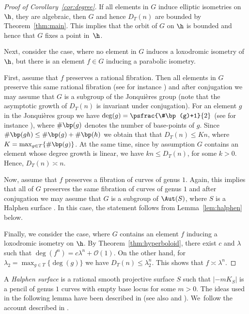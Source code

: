 \begin{proof}[Proof of Corollary~\ref{cor:degree}]
If all elements in $G$ induce elliptic isometries on $\h$, \ie they are algebraic, then $G$ and hence $D_T(n)$ are bounded by Theorem~\ref{thm:main}. This implies that the orbit of $G$ on $\h$ is bounded and hence that $G$ fixes a point in~$\h$.

Next, consider the case, where no element in $G$ induces a loxodromic isometry of~$\h$, but there is an element $f\in G$ inducing a parabolic isometry.

First, assume that $f$ preserves a rational fibration. Then all elements in $G$ preserve this same rational fibration (see for instance \cite[Lem.\,5.3.4]{urech2017subgroups}) and after conjugation we may assume that $G$ is a subgroup of the Jonquières group (note that the asymptotic growth of $D_T(n)$ is invariant under conjugation). For an element $g$ in the Jonquières group we have $\deg(g)=\psfrac{\#\bp(g)+1}{2}$ (see for instance \cite{Lamy_Cremona}), where $\#\bp(g)$ denotes the number of base-points of $g$. Since $\#\bp(gh)\leq \#\bp(g)+\#\bp(h)$ we obtain that that $D_T(n)\leq Kn$, where $K=\max_{g\in T}\{\#\bp(g)\}$. At the same time, since by assumption $G$ contains an element whose degree growth is linear, we have $kn\leq D_T(n)$, for some $k>0$. Hence, $D_T(n)\asymp n$.

Now, assume that $f$ preserves a fibration of curves of genus $1$. Again, this implies that all of $G$ preserves the same fibration of curves of genus $1$ and after conjugation we may assume that $G$ is a subgroup of $\Aut(S)$, where $S$ is a Halphen surface \cite[Lem.\,5.3.4]{urech2017subgroups}. In this case, the statement follows from Lemma~\ref{lem:halphen} below.

Finally, we consider the case, where $G$ contains an element $f$ inducing a loxodromic isometry on $\h$. By Theorem~\ref{thm:hyperboloid}, there exist $c$ and $\lambda$ such that $\deg(f^n)=c\lambda^n+\mathcal{O}(1)$. On the other hand, for $\lambda_2=\max_{g\in T}\{\deg(g)\}$ we have $D_T(n)\leq \lambda_2^n$. This shows that $f\asymp \lambda^n$.
\end{proof}

A \emph{Halphen surface} is a rational smooth projective surface $S$ such that $|{-}mK_S|$ is a pencil of genus $1$ curves with empty base locus for some $m>0$. The ideas used in the following lemma have been described in \cite{gizatullin1980rational} (see also \cite{grivaux2013parabolic} and \cite{cantat2012rational}). We~follow the account described in \cite{Lamy_Cremona}.

